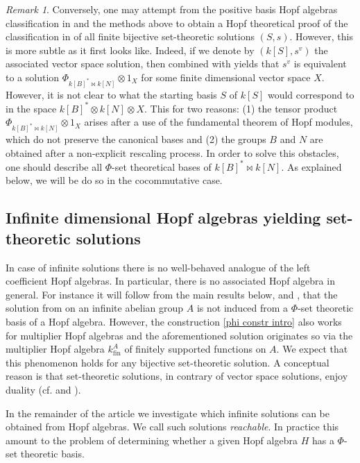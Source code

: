 \documentclass[a4paper,10pt]{amsart}
\theoremstyle{definition}
\theoremstyle{remark}
\newtheorem*{remark*}{Remark}
\newcommand{\fin}{\operatorname{fin}}
\newcommand\ot{\otimes}
\begin{document}
\begin{remark*}
Conversely, one may attempt from the positive basis Hopf algebras classification in \cite{zbMATH01616308} and the methods above to obtain a Hopf theoretical proof of the classification in \cite{COvA} of all finite bijective set-theoretic solutions $(S,s)$. However, this is more subtle as it first looks like. Indeed, if we denote by $(k[S],s^v)$ the associated vector space solution, then \cite[Theorem 5.7]{Dav} combined with \cite{zbMATH01616308} yields that $s^v$ is equivalent to a solution $\Phi_{k[B]^* \bowtie k[N]} \ot 1_X$ for some finite dimensional vector space $X$. However, it is not clear to what the starting basis $S$ of $k[S]$ would correspond to in the space $k[B]^* \ot k[N] \ot X$. This for two reasons: (1) the tensor product $\Phi_{k[B]^* \bowtie k[N]} \ot 1_X$ arises after a use of the fundamental theorem of Hopf modules, which do not preserve the canonical bases and (2) the groups $B$ and $N$ are obtained after a non-explicit rescaling process. In order to solve this obstacles, one should describe all $\Phi$-set theoretical bases of $k[B]^* \bowtie k[N]$. As explained below, we will be do so in the cocommutative case.
\end{remark*}


\subsection{Infinite dimensional Hopf algebras yielding set-theoretic solutions}\label{subsec:infinite}
In case of infinite solutions there is no well-behaved analogue of the left coefficient Hopf algebras. In particular, there is no associated Hopf algebra in general. For instance it will follow from the main results below,  and , that the solution from  on an infinite abelian group $A$ is not induced from a $\Phi$-set theoretic basis of a Hopf algebra. However, the construction \eqref{phi constr intro} also works for multiplier Hopf algebras and the aforementioned solution originates so via the multiplier Hopf algebra $k_{\fin}^A$ of finitely supported functions on $A$. We expect that this phenomenon holds for any bijective set-theoretic solution. A conceptual reason is that set-theoretic solutions, in contrary of vector space solutions, enjoy duality (cf.  and ).

In the remainder of the article we investigate which infinite solutions can be obtained from Hopf algebras. We call such solutions \emph{reachable}. In practice this amount to the problem of determining whether a given Hopf algebra $H$ has a $\Phi$-set theoretic basis.
\end{document}
